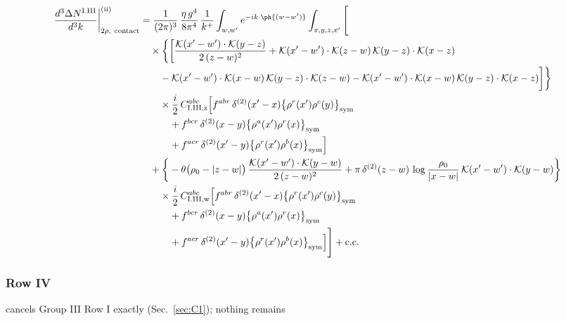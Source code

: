 \begin{align}
\frac{d^{3}\Delta N^{\rm I.III}}{d^{3}k}\bigg|^{\rm (ii)}_{2\rho,\ {\rm contact}}&=\frac{1}{(2\pi)^{3}}\,\frac{\eta\,g^{4}}{8\pi^{4}}\,\frac{1}{k^{+}}\int_{w,w'}e^{-ik\cdot\ph{(w-w')}}\int_{x,y,z,x'}\Bigg[\notag\\
&\quad\times\bigg\{\bigg[\frac{\mathcal{K}(x'-w')\cdot\mathcal{K}(y-z)}{2\,(z-w)^{2}}+\mathcal{K}(x'-w')\cdot\mathcal{K}(z-w)\,\mathcal{K}(y-z)\cdot\mathcal{K}(x-z)\notag\\
&\qquad-\mathcal{K}(x'-w')\cdot\mathcal{K}(x-w)\,\mathcal{K}(y-z)\cdot\mathcal{K}(z-w)-\mathcal{K}(x'-w')\cdot\mathcal{K}(x-w)\,\mathcal{K}(y-z)\cdot\mathcal{K}(x-z)\bigg]\bigg\}\notag\\
&\qquad\times \frac{i}{2}\,C^{abc}_{{\rm I.III,z}}\Big[f^{abr}\,\delta^{(2)}(x'-x)\big\{\rho^{r}(x')\rho^{c}(y)\big\}_{\rm sym}\notag\\
&\qquad\quad +f^{bcr}\,\delta^{(2)}(x-y)\big\{\rho^{a}(x')\rho^{r}(x)\big\}_{\rm sym}\notag\\
&\qquad\quad +f^{acr}\,\delta^{(2)}(x'-y)\big\{\rho^{r}(x')\rho^{b}(x)\big\}_{\rm sym}\Big]\notag\\
&\quad+\bigg\{-\theta\big(\rho_{0}-|z-w|\big)\,\frac{\mathcal{K}(x'-w')\cdot\mathcal{K}(y-w)}{2\,(z-w)^{2}}+\pi\,\delta^{(2)}(z-w)\,\log\frac{\rho_{0}}{|x-w|}\,\mathcal{K}(x'-w')\cdot\mathcal{K}(y-w)\bigg\}\notag\\
&\qquad\times \frac{i}{2}\,C^{abc}_{{\rm I.III,w}}\Big[f^{abr}\,\delta^{(2)}(x'-x)\big\{\rho^{r}(x')\rho^{c}(y)\big\}_{\rm sym}\notag\\
&\qquad\quad +f^{bcr}\,\delta^{(2)}(x-y)\big\{\rho^{a}(x')\rho^{r}(x)\big\}_{\rm sym}\notag\\
&\qquad\quad +f^{acr}\,\delta^{(2)}(x'-y)\big\{\rho^{r}(x')\rho^{b}(x)\big\}_{\rm sym}\Big]\Bigg]+{\rm c.c.}\label{eq:D-I.IIIdN-2}
\end{align}
\subsubsection*{Row IV}
cancels Group III Row I exactly (Sec.~\ref{sec:C1}); nothing remains
